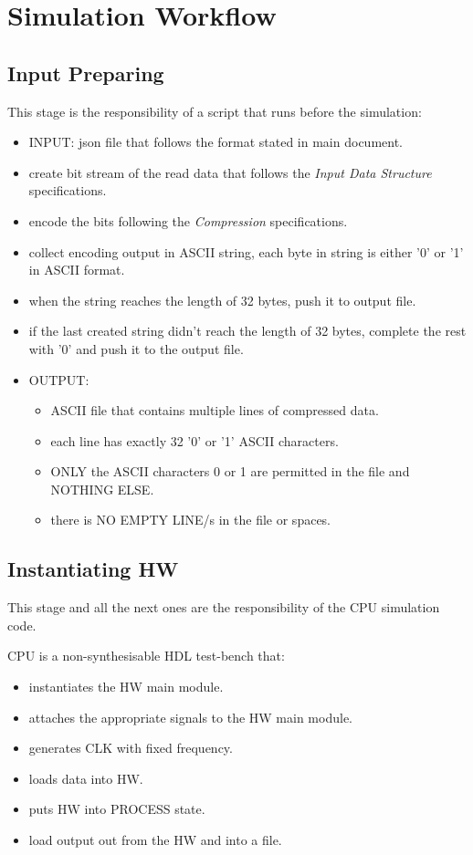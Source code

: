 \documentclass[12pt]{extarticle}
\begin{document}
\section{Simulation Workflow}

\subsection{Input Preparing}
This stage is the responsibility of a script that runs before the simulation:
\begin{itemize}
    \item INPUT: json file that follows the format stated in main document.
    \item create bit stream of the read data that follows the \emph{Input Data Structure} specifications.
    \item encode the bits following the \emph{Compression} specifications.
    \item collect encoding output in ASCII string, each byte in string is either '0' or '1' in ASCII format.
    \item when the string reaches the length of 32 bytes, push it to output file.
    \item if the last created string didn't reach the length of 32 bytes, complete the rest with '0' and push it to the output file.
    \item OUTPUT:
    \begin{itemize}
        \item ASCII file that contains multiple lines of compressed data.
        \item each line has exactly 32 '0' or '1' ASCII characters.
        \item ONLY the ASCII characters 0 or 1 are permitted in the file and NOTHING ELSE.
        \item there is NO EMPTY LINE/s in the file or spaces.
    \end{itemize}
\end{itemize}

\subsection{Instantiating HW}
This stage and all the next ones are the responsibility of the CPU simulation code.

CPU is a non-synthesisable HDL test-bench that:
\begin{itemize}
    \item instantiates the HW main module.
    \item attaches the appropriate signals to the HW main module.
    \item generates CLK with fixed frequency.
    \item loads data into HW.
    \item puts HW into PROCESS state.
    \item load output out from the HW and into a file.
\end{itemize}
\end{document}
